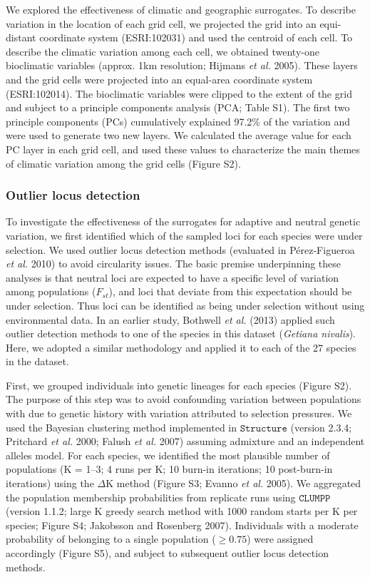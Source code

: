 \documentclass[11pt,]{article}
\begin{document}
We explored the effectiveness of climatic and geographic surrogates. To
describe variation in the location of each grid cell, we projected the
grid into an equi-distant coordinate system (ESRI:102031) and used the
centroid of each cell. To describe the climatic variation among each
cell, we obtained twenty-one bioclimatic variables (approx. 1km
resolution; Hijmans \emph{et al.} 2005). These layers and the grid cells
were projected into an equal-area coordinate system (ESRI:102014). The
bioclimatic variables were clipped to the extent of the grid and subject
to a principle components analysis (PCA; Table S1). The first two
principle components (PCs) cumulatively explained 97.2\% of the
variation and were used to generate two new layers. We calculated the
average value for each PC layer in each grid cell, and used these values
to characterize the main themes of climatic variation among the grid
cells (Figure S2).

\subsubsection{Outlier locus detection}\label{outlier-locus-detection}

To investigate the effectiveness of the surrogates for adaptive and
neutral genetic variation, we first identified which of the sampled loci
for each species were under selection. We used outlier locus detection
methods (evaluated in P{é}rez-Figueroa \emph{et al.} 2010) to avoid
circularity issues. The basic premise underpinning these analyses is
that neutral loci are expected to have a specific level of variation
among populations ($F_{st}$), and loci that deviate from this
expectation should be under selection. Thus loci can be identified as
being under selection without using environmental data. In an earlier
study, Bothwell \emph{et al.} (2013) applied such outlier detection
methods to one of the species in this dataset (\emph{Getiana nivalis}).
Here, we adopted a similar methodology and applied it to each of the 27
species in the dataset.

First, we grouped individuals into genetic lineages for each species
(Figure S2). The purpose of this step was to avoid confounding variation
between populations with due to genetic history with variation
attributed to selection pressures. We used the Bayesian clustering
method implemented in $\texttt{Structure}$ (version 2.3.4; Pritchard
\emph{et al.} 2000; Falush \emph{et al.} 2007) assuming admixture and an
independent alleles model. For each species, we identified the most
plausible number of populations (K = 1--3; 4 runs per K; 10 burn-in
iterations; 10 post-burn-in iterations) using the $\Delta$K method
(Figure S3; Evanno \emph{et al.} 2005). We aggregated the population
membership probabilities from replicate runs using $\texttt{CLUMPP}$
(version 1.1.2; large K greedy search method with 1000 random starts per
K per species; Figure S4; Jakobsson and Rosenberg 2007). Individuals
with a moderate probability of belonging to a single population
($\geq 0.75$) were assigned accordingly (Figure S5), and subject to
subsequent outlier locus detection methods.
\end{document}
